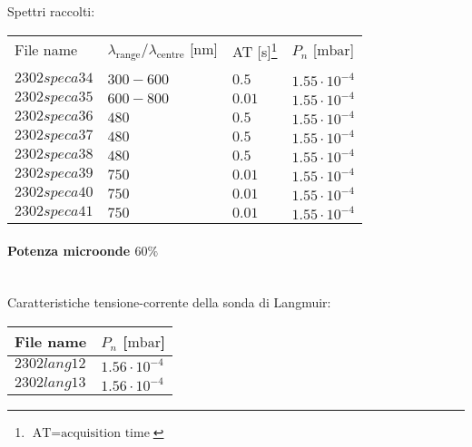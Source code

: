 Spettri raccolti:
\begin{center}
\begin{tabular}{p{3cm}p{4cm}p{2cm}p{3cm}}
\toprule
File name	&$\lambda_\text{range}\text{/}\lambda_\text{centre}$ [nm] &AT [s]\footnote{$\text{AT}=\text{acquisition time}$} &$P_{n}$ [$\si{\milli\bar}$]\\					&\\
\midrule
$2302speca34$	&$300-600$	&$0.5$		&$1.55\cdot10^{-4}$\\
$2302speca35$	&$600-800$	&$0.01$		&$1.55\cdot10^{-4}$\\
$2302speca36$	&$480$		&$0.5$		&$1.55\cdot10^{-4}$\\
$2302speca37$	&$480$		&$0.5$		&$1.55\cdot10^{-4}$\\
$2302speca38$	&$480$		&$0.5$		&$1.55\cdot10^{-4}$\\
$2302speca39$	&$750$		&$0.01$		&$1.55\cdot10^{-4}$\\
$2302speca40$	&$750$		&$0.01$		&$1.55\cdot10^{-4}$\\
$2302speca41$	&$750$		&$0.01$		&$1.55\cdot10^{-4}$\\
\bottomrule
\end{tabular}
\end{center}

\paragraph*{Potenza microonde $\text{60\%}$} ~\\
Caratteristiche tensione-corrente della sonda di Langmuir:
\begin{center}
\begin{tabular}{p{3cm}p{3cm}}
\toprule
File name	&$P_{n}$ [$\si{\milli\bar}$]\\
\midrule
$2302lang12$	&$1.56\cdot10^{-4}$\\
$2302lang13$	&$1.56\cdot10^{-4}$\\
\bottomrule
\end{tabular}
\end{center}

